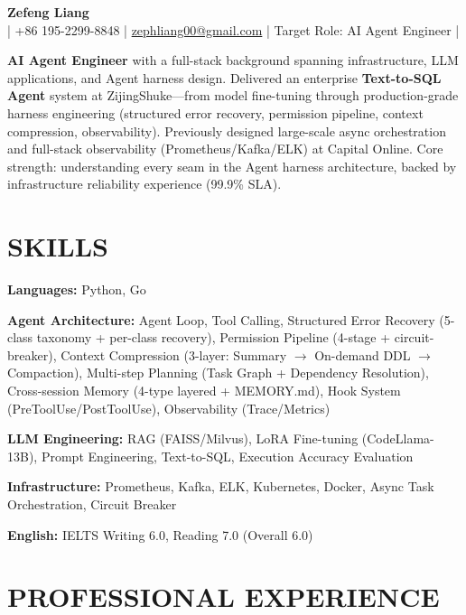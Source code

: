 \documentclass[10pt, a4paper]{article}
\begin{document}
\begin{center}
  {\Large\bfseries Zefeng Liang}\\[0.12em]
  {\small | +86 195-2299-8848 | \href{mailto:zephliang00@gmail.com}{zephliang00@gmail.com} | Target Role: AI Agent Engineer |}
\end{center}

\vspace{0.2em}

\noindent\textbf{AI Agent Engineer} with a full-stack background spanning infrastructure, LLM applications, and Agent harness design. Delivered an enterprise \textbf{Text-to-SQL Agent} system at ZijingShuke---from model fine-tuning through production-grade harness engineering (structured error recovery, permission pipeline, context compression, observability). Previously designed large-scale async orchestration and full-stack observability (Prometheus/Kafka/ELK) at Capital Online. Core strength: understanding every seam in the Agent harness architecture, backed by infrastructure reliability experience (99.9\% SLA).

\section{SKILLS}

\noindent\textbf{Languages:} Python, Go

\noindent\textbf{Agent Architecture:} Agent Loop, Tool Calling, Structured Error Recovery (5-class taxonomy + per-class recovery), Permission Pipeline (4-stage + circuit-breaker), Context Compression (3-layer: Summary $\to$ On-demand DDL $\to$ Compaction), Multi-step Planning (Task Graph + Dependency Resolution), Cross-session Memory (4-type layered + MEMORY.md), Hook System (PreToolUse/PostToolUse), Observability (Trace/Metrics)

\noindent\textbf{LLM Engineering:} RAG (FAISS/Milvus), LoRA Fine-tuning (CodeLlama-13B), Prompt Engineering, Text-to-SQL, Execution Accuracy Evaluation

\noindent\textbf{Infrastructure:} Prometheus, Kafka, ELK, Kubernetes, Docker, Async Task Orchestration, Circuit Breaker

\noindent\textbf{English:} IELTS Writing 6.0, Reading 7.0 (Overall 6.0)

\section{PROFESSIONAL EXPERIENCE}
\end{document}
